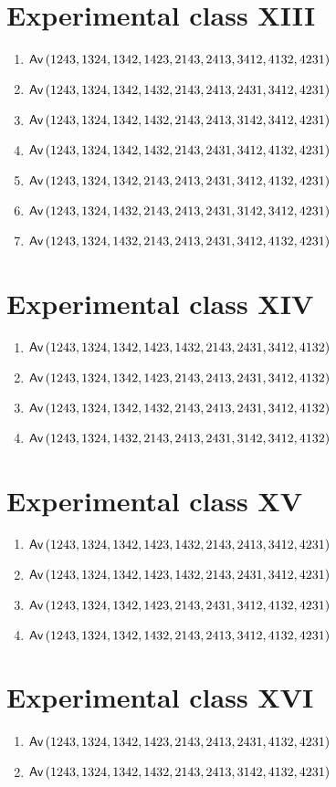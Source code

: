 \section{Experimental class XIII}
\begin{enumerate}
\item $\textsf{Av}\left(1243,1324,1342,1423,2143,2413,3412,4132,4231\right)$
\item $\textsf{Av}\left(1243,1324,1342,1432,2143,2413,2431,3412,4231\right)$
\item $\textsf{Av}\left(1243,1324,1342,1432,2143,2413,3142,3412,4231\right)$
\item $\textsf{Av}\left(1243,1324,1342,1432,2143,2431,3412,4132,4231\right)$
\item $\textsf{Av}\left(1243,1324,1342,2143,2413,2431,3412,4132,4231\right)$
\item $\textsf{Av}\left(1243,1324,1432,2143,2413,2431,3142,3412,4231\right)$
\item $\textsf{Av}\left(1243,1324,1432,2143,2413,2431,3412,4132,4231\right)$
\end{enumerate}

\section{Experimental class XIV}
\begin{enumerate}
\item $\textsf{Av}\left(1243,1324,1342,1423,1432,2143,2431,3412,4132\right)$
\item $\textsf{Av}\left(1243,1324,1342,1423,2143,2413,2431,3412,4132\right)$
\item $\textsf{Av}\left(1243,1324,1342,1432,2143,2413,2431,3412,4132\right)$
\item $\textsf{Av}\left(1243,1324,1432,2143,2413,2431,3142,3412,4132\right)$
\end{enumerate}

\section{Experimental class XV}
\begin{enumerate}
\item $\textsf{Av}\left(1243,1324,1342,1423,1432,2143,2413,3412,4231\right)$
\item $\textsf{Av}\left(1243,1324,1342,1423,1432,2143,2431,3412,4231\right)$
\item $\textsf{Av}\left(1243,1324,1342,1423,2143,2431,3412,4132,4231\right)$
\item $\textsf{Av}\left(1243,1324,1342,1432,2143,2413,3412,4132,4231\right)$
\end{enumerate}

\section{Experimental class XVI}
\begin{enumerate}
\item $\textsf{Av}\left(1243,1324,1342,1423,2143,2413,2431,4132,4231\right)$
\item $\textsf{Av}\left(1243,1324,1342,1432,2143,2413,3142,4132,4231\right)$
\end{enumerate}

